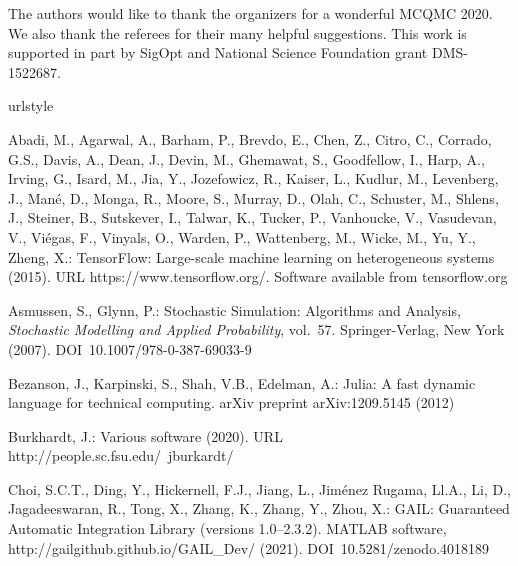 \documentclass[graybox]{svmult}
\begin{document}
\begin{acknowledgement}
The authors would like to thank the organizers for a wonderful MCQMC 2020. 
We also thank the referees for their many helpful suggestions.  This work is supported in part by SigOpt and National Science Foundation grant DMS-1522687.
\end{acknowledgement}

%
%


\begin{thebibliography}{10}
\providecommand{\url}[1]{{#1}}
\providecommand{\urlprefix}{URL }
\expandafter\ifx\csname urlstyle\endcsname\relax
  \providecommand{\doi}[1]{DOI~\discretionary{}{}{}#1}\else
  \providecommand{\doi}{DOI~\discretionary{}{}{}\begingroup
  \urlstyle{rm}\Url}\fi

Abadi, M., Agarwal, A., Barham, P., Brevdo, E., Chen, Z., Citro, C., Corrado,
  G.S., Davis, A., Dean, J., Devin, M., Ghemawat, S., Goodfellow, I., Harp, A.,
  Irving, G., Isard, M., Jia, Y., Jozefowicz, R., Kaiser, L., Kudlur, M.,
  Levenberg, J., Man\'{e}, D., Monga, R., Moore, S., Murray, D., Olah, C.,
  Schuster, M., Shlens, J., Steiner, B., Sutskever, I., Talwar, K., Tucker, P.,
  Vanhoucke, V., Vasudevan, V., Vi\'{e}gas, F., Vinyals, O., Warden, P.,
  Wattenberg, M., Wicke, M., Yu, Y., Zheng, X.: {TensorFlow}: Large-scale
  machine learning on heterogeneous systems (2015).
\newblock \urlprefix\url{https://www.tensorflow.org/}.
\newblock Software available from tensorflow.org

Asmussen, S., Glynn, P.: Stochastic Simulation: Algorithms and Analysis,
  \emph{Stochastic Modelling and Applied Probability}, vol.~57.
\newblock Springer-Verlag, New York (2007).
\newblock \doi{10.1007/978-0-387-69033-9}

Bezanson, J., Karpinski, S., Shah, V.B., Edelman, A.: Julia: {A} fast dynamic
  language for technical computing.
\newblock arXiv preprint arXiv:1209.5145  (2012)

Burkhardt, J.: Various software (2020).
\newblock \urlprefix\url{http://people.sc.fsu.edu/~jburkardt/}

Choi, S.C.T., Ding, Y., Hickernell, F.J., Jiang, L., {Jim\'enez Rugama},
  {\relax Ll}.A., Li, D., Jagadeeswaran, R., Tong, X., Zhang, K., Zhang, Y.,
  Zhou, X.: {GAIL}: {G}uaranteed {A}utomatic {I}ntegration {L}ibrary (versions
  1.0--2.3.2).
\newblock MATLAB software, \url{http://gailgithub.github.io/GAIL\_Dev/} (2021).
\newblock \doi{10.5281/zenodo.4018189}


\end{thebibliography}
\end{document}
